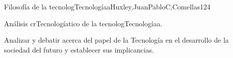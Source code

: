 \begin{syllabus}
\begin{unit}{Filosofía de la tecnologTecnologíaa}{Huxley,JuanPabloC,Comellas}{12}{4}
\begin{topics}
      \item {Análisis crTecnologíatico de la tecnologTecnologíaa.}
\end{topics}
\begin{learningoutcomes}
	\item Analizar  y debatir acerca del papel de la Tecnología en el desarrollo de la sociedad del futuro y establecer  sus implicancias. 
\end{learningoutcomes}
\end{unit}



\begin{coursebibliography}
\end{coursebibliography}

\end{syllabus}

%
